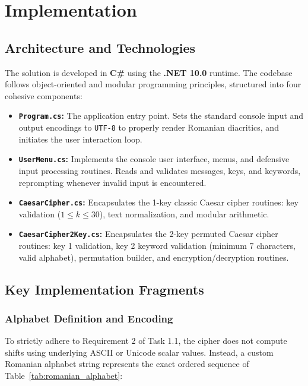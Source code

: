 \documentclass[12pt,a4paper]{article}
\begin{document}
\section{Implementation}

\subsection{Architecture and Technologies}
The solution is developed in \textbf{C\#} using the \textbf{.NET 10.0} runtime. The codebase follows object-oriented and modular programming principles, structured into four cohesive components:
\begin{itemize}
    \item \textbf{\texttt{Program.cs}:} The application entry point. Sets the standard console input and output encodings to \texttt{UTF-8} to properly render Romanian diacritics, and initiates the user interaction loop.
    \item \textbf{\texttt{UserMenu.cs}:} Implements the console user interface, menus, and defensive input processing routines. Reads and validates messages, keys, and keywords, reprompting whenever invalid input is encountered.
    \item \textbf{\texttt{CaesarCipher.cs}:} Encapsulates the 1-key classic Caesar cipher routines: key validation ($1 \le k \le 30$), text normalization, and modular arithmetic.
    \item \textbf{\texttt{CaesarCipher2Key.cs}:} Encapsulates the 2-key permuted Caesar cipher routines: key 1 validation, key 2 keyword validation (minimum 7 characters, valid alphabet), permutation builder, and encryption/decryption routines.
\end{itemize}

\subsection{Key Implementation Fragments}

\subsubsection{Alphabet Definition and Encoding}
To strictly adhere to Requirement 2 of Task 1.1, the cipher does not compute shifts using underlying ASCII or Unicode scalar values. Instead, a custom Romanian alphabet string represents the exact ordered sequence of Table~\ref{tab:romanian_alphabet}:
\end{document}
